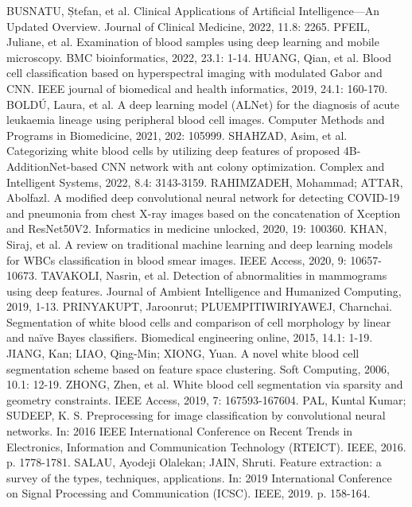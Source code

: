 \documentclass[conference]{IEEEtran}
\begin{document}
\begin{thebibliography}{00}
 BUSNATU, Ștefan, et al. Clinical Applications of Artificial Intelligence—An Updated Overview. Journal of Clinical Medicine, 2022, 11.8: 2265.
 PFEIL, Juliane, et al. Examination of blood samples using deep learning and mobile microscopy. BMC bioinformatics, 2022, 23.1: 1-14.
 HUANG, Qian, et al. Blood cell classification based on hyperspectral imaging with modulated Gabor and CNN. IEEE journal of biomedical and health informatics, 2019, 24.1: 160-170.
 BOLDÚ, Laura, et al. A deep learning model (ALNet) for the diagnosis of acute leukaemia lineage using peripheral blood cell images. Computer Methods and Programs in Biomedicine, 2021, 202: 105999.
 SHAHZAD, Asim, et al. Categorizing white blood cells by utilizing deep features of proposed 4B-AdditionNet-based CNN network with ant colony optimization. Complex and Intelligent Systems, 2022, 8.4: 3143-3159.
 RAHIMZADEH, Mohammad; ATTAR, Abolfazl. A modified deep convolutional neural network for detecting COVID-19 and pneumonia from chest X-ray images based on the concatenation of Xception and ResNet50V2. Informatics in medicine unlocked, 2020, 19: 100360.
 KHAN, Siraj, et al. A review on traditional machine learning and deep learning models for WBCs classification in blood smear images. IEEE Access, 2020, 9: 10657-10673.
 TAVAKOLI, Nasrin, et al. Detection of abnormalities in mammograms using deep features. Journal of Ambient Intelligence and Humanized Computing, 2019, 1-13. 
 PRINYAKUPT, Jaroonrut; PLUEMPITIWIRIYAWEJ, Charnchai. Segmentation of white blood cells and comparison of cell morphology by linear and naïve Bayes classifiers. Biomedical engineering online, 2015, 14.1: 1-19. 
 JIANG, Kan; LIAO, Qing-Min; XIONG, Yuan. A novel white blood cell segmentation scheme based on feature space clustering. Soft Computing, 2006, 10.1: 12-19.
 ZHONG, Zhen, et al. White blood cell segmentation via sparsity and geometry constraints. IEEE Access, 2019, 7: 167593-167604.
 PAL, Kuntal Kumar; SUDEEP, K. S. Preprocessing for image classification by convolutional neural networks. In: 2016 IEEE International Conference on Recent Trends in Electronics, Information and Communication Technology (RTEICT). IEEE, 2016. p. 1778-1781.
 SALAU, Ayodeji Olalekan; JAIN, Shruti. Feature extraction: a survey of the types, techniques, applications. In: 2019 International Conference on Signal Processing and Communication (ICSC). IEEE, 2019. p. 158-164.

\end{thebibliography}
\end{document}
